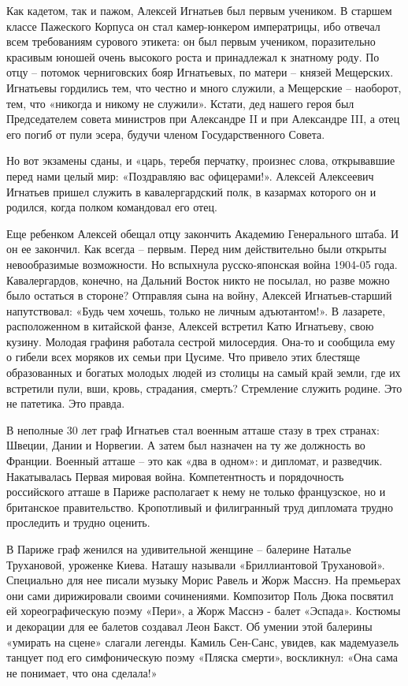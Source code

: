 Как кадетом, так и пажом, Алексей Игнатьев был первым учеником. В старшем
классе Пажеского Корпуса он стал камер-юнкером императрицы, ибо отвечал всем
требованиям сурового этикета: он был первым учеником, поразительно красивым
юношей очень высокого роста и принадлежал к знатному роду. По отцу – потомок
черниговских бояр Игнатьевых, по матери – князей Мещерских. Игнатьевы гордились
тем, что честно и много служили, а Мещерские – наоборот, тем, что «никогда и
никому не служили». Кстати, дед нашего героя был Председателем совета министров
при Александре II и при Александре III, а отец его погиб от пули эсера, будучи
членом Государственного Совета. 

Но вот экзамены сданы, и «царь, теребя перчатку, произнес слова, открывавшие
перед нами целый мир: «Поздравляю вас офицерами!». Алексей Алексеевич Игнатьев
пришел служить в кавалергардский полк, в казармах которого он и родился, когда
полком командовал его отец.  

Еще ребенком Алексей обещал отцу закончить Академию Генерального штаба. И он ее
закончил. Как всегда – первым. Перед ним действительно были открыты
невообразимые возможности. Но вспыхнула русско-японская война 1904-05 года.
Кавалергардов, конечно, на Дальний Восток никто не посылал, но разве можно было
остаться в стороне? Отправляя сына на войну, Алексей Игнатьев-старший
напутствовал: «Будь чем хочешь, только не личным адъютантом!». В лазарете,
расположенном в китайской фанзе, Алексей встретил Катю Игнатьеву, свою кузину.
Молодая графиня работала сестрой милосердия. Она-то и сообщила ему о гибели
всех моряков их семьи при Цусиме. Что привело этих блестяще образованных и
богатых молодых людей из столицы на самый край земли, где их встретили пули,
вши, кровь, страдания, смерть? Стремление служить родине. Это не патетика. Это
правда.    

В неполные 30 лет граф Игнатьев стал военным атташе стазу в трех странах:
Швеции, Дании и Норвегии. А затем был назначен на ту же должность во Франции.
Военный атташе – это как «два в одном»: и дипломат, и разведчик. Накатывалась
Первая мировая война. Компетентность и порядочность российского атташе в Париже
располагает к нему не только французское, но и британское правительство.
Кропотливый и филигранный труд дипломата трудно проследить и трудно оценить.

В Париже граф женился на удивительной женщине – балерине Наталье Трухановой,
уроженке Киева. Наташу называли «Бриллиантовой Трухановой». Специально для нее
писали музыку Морис Равель и Жорж Масснэ. На премьерах они сами дирижировали
своими сочинениями. Композитор Поль Дюка посвятил ей хореографическую поэму
«Пери», а Жорж Масснэ - балет «Эспада». Костюмы и декорации для ее балетов
создавал Леон Бакст. Об умении этой балерины «умирать на сцене» слагали
легенды. Камиль Сен-Санс, увидев, как мадемуазель танцует под его симфоническую
поэму «Пляска смерти», воскликнул: «Она сама не понимает, что она сделала!» 

